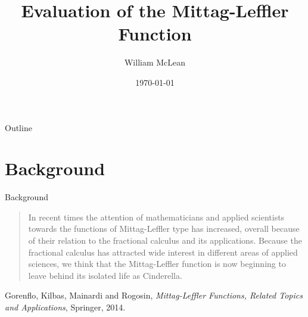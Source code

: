 \documentclass{beamer}
\title{Evaluation of the Mittag-Leffler Function}
\author{William McLean}
\date{\today}
\begin{document}
\begin{frame}
\titlepage
\end{frame}
\begin{frame}{Outline}
\tableofcontents
\end{frame}
\section{Background}
\begin{frame}{Background}
\begin{quote}
In recent times the attention of mathematicians and applied scientists towards 
the functions of Mittag-Leffler type has increased, overall because of their 
relation to the fractional calculus and its applications. Because the 
fractional calculus has attracted wide interest in different areas of applied 
sciences, we think that the Mittag-Leffler function is now beginning to leave  
behind its isolated life as Cinderella. 
\end{quote}

Gorenflo, Kilbas, Mainardi and Rogosin, \emph{Mittag-Leffler Functions, 
Related Topics and Applications}, Springer, 2014. 
\end{frame}
\end{document}
